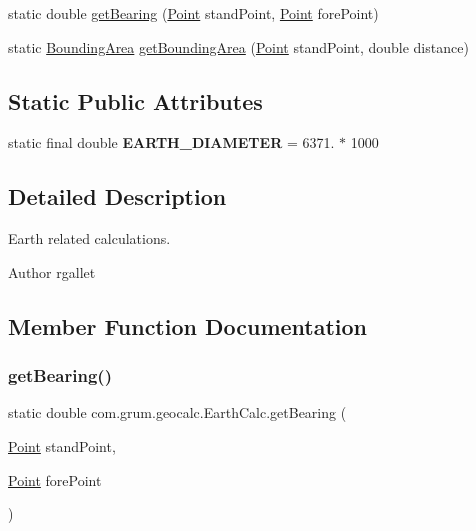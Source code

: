 \begin{DoxyCompactItemize}
\item 
static double \mbox{\hyperlink{classcom_1_1grum_1_1geocalc_1_1_earth_calc_a38a392d53524da1dfa433514bab6e04d}{get\+Bearing}} (\mbox{\hyperlink{classcom_1_1grum_1_1geocalc_1_1_point}{Point}} stand\+Point, \mbox{\hyperlink{classcom_1_1grum_1_1geocalc_1_1_point}{Point}} fore\+Point)
\item 
static \mbox{\hyperlink{classcom_1_1grum_1_1geocalc_1_1_bounding_area}{Bounding\+Area}} \mbox{\hyperlink{classcom_1_1grum_1_1geocalc_1_1_earth_calc_a0a74a2e87389d9c0358d0ea7c58951fb}{get\+Bounding\+Area}} (\mbox{\hyperlink{classcom_1_1grum_1_1geocalc_1_1_point}{Point}} stand\+Point, double distance)
\end{DoxyCompactItemize}
\subsection*{Static Public Attributes}
\begin{DoxyCompactItemize}
\item 
\mbox{\label{classcom_1_1grum_1_1geocalc_1_1_earth_calc_a6ca0daf49bbbc9249d211b2053f5d7a6}} 
static final double {\bfseries E\+A\+R\+T\+H\+\_\+\+D\+I\+A\+M\+E\+T\+ER} = 6371. $\ast$ 1000
\end{DoxyCompactItemize}


\subsection{Detailed Description}
Earth related calculations.

\begin{DoxyAuthor}{Author}
rgallet 
\end{DoxyAuthor}


\subsection{Member Function Documentation}
\mbox{\label{classcom_1_1grum_1_1geocalc_1_1_earth_calc_a38a392d53524da1dfa433514bab6e04d}} 
\subsubsection{\texorpdfstring{get\+Bearing()}{getBearing()}}
{\footnotesize\ttfamily static double com.\+grum.\+geocalc.\+Earth\+Calc.\+get\+Bearing (\begin{DoxyParamCaption}\item[{\mbox{\hyperlink{classcom_1_1grum_1_1geocalc_1_1_point}{Point}}}]{stand\+Point,  }\item[{\mbox{\hyperlink{classcom_1_1grum_1_1geocalc_1_1_point}{Point}}}]{fore\+Point }\end{DoxyParamCaption})\hspace{0.3cm}{\ttfamily [static]}}


